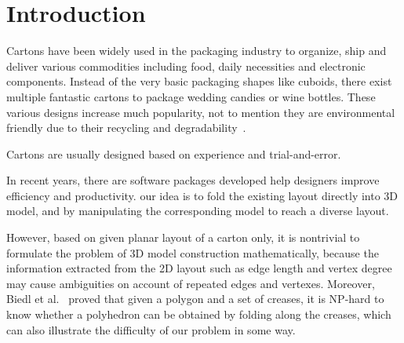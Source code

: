 \section{Introduction}

Cartons have been widely used in the packaging industry to organize, ship and deliver various commodities including food, daily necessities and electronic components. Instead of the very basic packaging shapes like cuboids, there exist multiple fantastic cartons to package wedding candies or wine bottles. 
These various designs increase much popularity, not to mention they are environmental friendly due to their recycling and degradability~\cite{Mullineux:2010:CSC:1739328.1739673}.

Cartons are usually designed based on experience and trial-and-error.

In recent years, there are software packages developed help designers improve efficiency and productivity.
 our idea is to fold the existing layout directly into 3D model, and by manipulating the corresponding model to reach a diverse layout.

However, based on given planar layout of a carton only, it is nontrivial to formulate the problem of 3D model construction mathematically, because the information extracted from the 2D layout such as edge length and vertex degree may cause ambiguities on account of repeated edges and vertexes. Moreover, Biedl et al.~\cite{Biedl:2005:NFP:1090462.1646553} proved that given a polygon and a set of creases, it is NP-hard to know whether a polyhedron can be obtained by folding along the creases, which can also illustrate the difficulty of our problem in some way.

